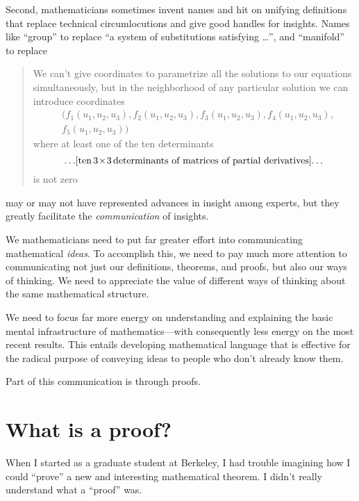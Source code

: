 \documentclass[12pt,oneside]{amsart}
\begin{document}
Second, mathematicians sometimes invent names
and hit on unifying definitions that replace technical
circumlocutions and give good handles for insights.  
Names like ``group'' to replace ``a system of substitutions 
satisfying \dots'', 
and ``manifold'' to replace
\begin{quote}
We can't give coordinates to
parametrize all the solutions to our equations 
simultaneously,
but in the neighborhood of any particular solution we can 
introduce
coordinates
\begin{equation*}
\begin{aligned}
&(f_1(u_1,u_2,u_3), f_2(u_1,u_2,u_3), f_3(u_1,u_2,u_3), 
f_4(u_1,u_2,u_3),\\
&f_5(u_1,u_2,u_3))\end{aligned}\end{equation*}
where at least one of the ten determinants 
$$ \dots\! \text{[ten \!$3\!\times\!3$ \!determinants 
of matrices of partial derivatives]} \!\dots 
$$
is not zero
\end{quote}
may or may not have represented advances in insight among 
experts,
but they greatly facilitate the {\it communication} of 
insights.

\bigskip

We mathematicians need to put far greater effort into 
communicating mathematical {\it ideas}.
To accomplish this, we need to pay much more attention to 
communicating
not just our definitions, theorems, and proofs, but also
our ways of thinking.  We need to appreciate the value of 
different ways
of thinking about the same mathematical structure.

We need to focus far more
energy on understanding and explaining
the basic mental infrastructure of mathematics---with 
consequently
less energy on the most recent results.   This entails 
developing
mathematical language that is effective for the radical 
purpose of
conveying ideas to people who don't already know them.

Part of this communication is through proofs.

\section{What is a proof?}

When I started as a graduate student at Berkeley, I had 
trouble imagining
how I could ``prove'' a new and interesting mathematical 
theorem.
I didn't really understand what a ``proof'' was.
\end{document}
